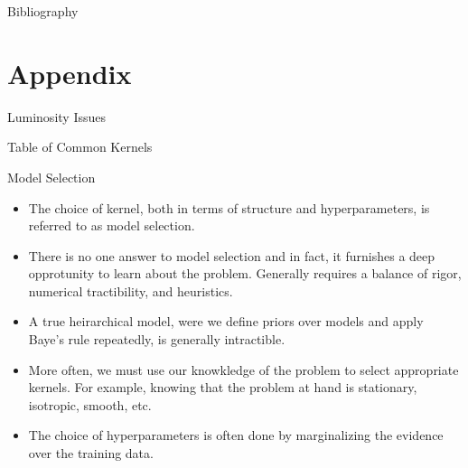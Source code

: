 \documentclass[10pt]{beamer}
\begin{document}
\begin{frame}{Bibliography}
  
  
\end{frame}


\appendix

\section{Appendix}
\label{sec:appendix}


\begin{frame}{Luminosity Issues}
  \relax
\end{frame}

\begin{frame}{Table of Common Kernels}
  \begin{center}
  \end{center}
\end{frame}

\begin{frame}{Model Selection}
  \begin{itemize}
  \item The choice of kernel, both in terms of structure and hyperparameters, is referred to as model selection. 
  \item There is no one answer to model selection and in fact, it furnishes a deep opprotunity to learn about the problem.
    Generally requires a balance of rigor, numerical tractibility, and heuristics.  
  \item A true heirarchical model, were we define priors over models and apply Baye's rule repeatedly, is generally intractible.
  \item More often, we must use our knowkledge of the problem to select appropriate kernels. For example, knowing that the problem at hand is stationary, isotropic, smooth, etc. 
  \item The choice of hyperparameters is often done by marginalizing the evidence over the training data.
  \end{itemize}
\end{frame}
\end{document}
